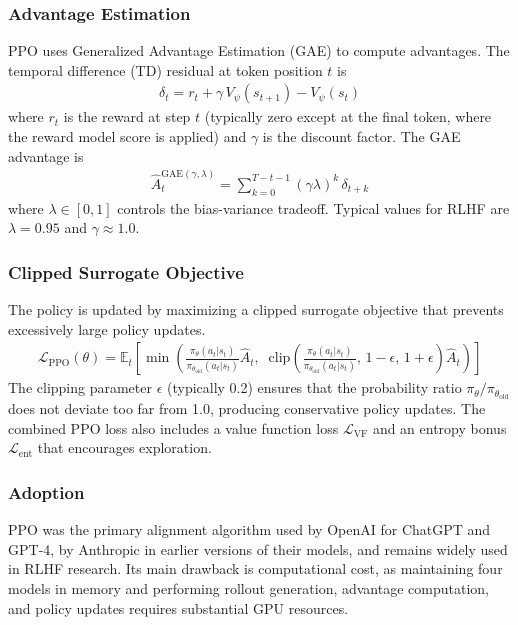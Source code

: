 \documentclass[12pt]{article}
\begin{document}
\subsubsection{Advantage Estimation}

PPO uses Generalized Advantage Estimation (GAE) to compute advantages. The temporal difference (TD) residual at token position $t$ is
\begin{align}
\delta_t = r_t + \gamma \, V_\psi(s_{t+1}) - V_\psi(s_t)
\end{align}
where $r_t$ is the reward at step $t$ (typically zero except at the final token, where the reward model score is applied) and $\gamma$ is the discount factor. The GAE advantage is
\begin{align}
\hat{A}_t^{\text{GAE}(\gamma, \lambda)} = \sum_{k=0}^{T-t-1} (\gamma \lambda)^k \, \delta_{t+k}
\end{align}
where $\lambda \in [0,1]$ controls the bias-variance tradeoff. Typical values for RLHF are $\lambda = 0.95$ and $\gamma \approx 1.0$.

\subsubsection{Clipped Surrogate Objective}

The policy is updated by maximizing a clipped surrogate objective that prevents excessively large policy updates.
\begin{align}
\mathcal{L}_{\text{PPO}}(\theta) = \mathbb{E}_t \left[ \min\!\left( \frac{\pi_\theta(a_t | s_t)}{\pi_{\theta_{\text{old}}}(a_t | s_t)} \hat{A}_t, \;\; \text{clip}\!\left(\frac{\pi_\theta(a_t | s_t)}{\pi_{\theta_{\text{old}}}(a_t | s_t)},\, 1-\epsilon,\, 1+\epsilon\right) \hat{A}_t \right) \right]
\end{align}
The clipping parameter $\epsilon$ (typically 0.2) ensures that the probability ratio $\pi_\theta / \pi_{\theta_{\text{old}}}$ does not deviate too far from 1.0, producing conservative policy updates. The combined PPO loss also includes a value function loss $\mathcal{L}_{\text{VF}}$ and an entropy bonus $\mathcal{L}_{\text{ent}}$ that encourages exploration.

\subsubsection{Adoption}

PPO was the primary alignment algorithm used by OpenAI for ChatGPT and GPT-4, by Anthropic in earlier versions of their models, and remains widely used in RLHF research. Its main drawback is computational cost, as maintaining four models in memory and performing rollout generation, advantage computation, and policy updates requires substantial GPU resources.
\end{document}
